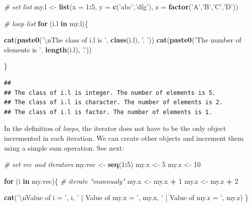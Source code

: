 \documentclass[11pt,]{book}
\newenvironment{Shaded}{\begin{snugshade}}{\end{snugshade}}
\newcommand{\KeywordTok}[1]{\textcolor[rgb]{0.27,0.27,0.27}{\textbf{#1}}}
\newcommand{\DataTypeTok}[1]{\textcolor[rgb]{0.27,0.27,0.27}{#1}}
\newcommand{\DecValTok}[1]{\textcolor[rgb]{0.06,0.06,0.06}{#1}}
\newcommand{\CharTok}[1]{\textcolor[rgb]{0.5,0.5,0.5}{#1}}
\newcommand{\StringTok}[1]{\textcolor[rgb]{0.5,0.5,0.5}{#1}}
\newcommand{\CommentTok}[1]{\textcolor[rgb]{0.56,0.35,0.01}{\textit{#1}}}
\newcommand{\ControlFlowTok}[1]{\textcolor[rgb]{0.13,0.29,0.53}{\textbf{#1}}}
\newcommand{\OperatorTok}[1]{\textcolor[rgb]{0.81,0.36,0.00}{\textbf{#1}}}
\newcommand{\NormalTok}[1]{#1}
\begin{document}
\begin{Shaded}
\begin{Highlighting}[]
\CommentTok{# set list}
\NormalTok{my.l <-}\StringTok{ }\KeywordTok{list}\NormalTok{(}\DataTypeTok{x =} \DecValTok{1}\OperatorTok{:}\DecValTok{5}\NormalTok{, }
             \DataTypeTok{y =} \KeywordTok{c}\NormalTok{(}\StringTok{'abc'}\NormalTok{,}\StringTok{'dfg'}\NormalTok{), }
             \DataTypeTok{z =} \KeywordTok{factor}\NormalTok{(}\StringTok{'A'}\NormalTok{,}\StringTok{'B'}\NormalTok{,}\StringTok{'C'}\NormalTok{,}\StringTok{'D'}\NormalTok{))}

\CommentTok{# loop list}
\ControlFlowTok{for}\NormalTok{ (i.l }\ControlFlowTok{in}\NormalTok{ my.l)\{}
  
  \KeywordTok{cat}\NormalTok{(}\KeywordTok{paste0}\NormalTok{(}\StringTok{'}\CharTok{\textbackslash{}n}\StringTok{The class of i.l is '}\NormalTok{, }\KeywordTok{class}\NormalTok{(i.l), }\StringTok{'. '}\NormalTok{))}
  \KeywordTok{cat}\NormalTok{(}\KeywordTok{paste0}\NormalTok{(}\StringTok{'The number of elements is '}\NormalTok{, }\KeywordTok{length}\NormalTok{(i.l), }\StringTok{'.'}\NormalTok{))}
  
\NormalTok{\}}
\end{Highlighting}
\end{Shaded}

\begin{verbatim}
## 
## The class of i.l is integer. The number of elements is 5.
## The class of i.l is character. The number of elements is 2.
## The class of i.l is factor. The number of elements is 1.
\end{verbatim}

In the definition of \emph{loops}, the iterator does not have to be the
only object incremented in each iteration. We can create other objects
and increment them using a simple sum operation. See next:

\begin{Shaded}
\begin{Highlighting}[]
\CommentTok{# set vec and iterators}
\NormalTok{my.vec <-}\StringTok{ }\KeywordTok{seq}\NormalTok{(}\DecValTok{1}\OperatorTok{:}\DecValTok{5}\NormalTok{)}
\NormalTok{my.x <-}\StringTok{ }\DecValTok{5}
\NormalTok{my.z <-}\StringTok{ }\DecValTok{10}

\ControlFlowTok{for}\NormalTok{ (i }\ControlFlowTok{in}\NormalTok{ my.vec)\{}
  \CommentTok{# iterate "mannualy"}
\NormalTok{  my.x <-}\StringTok{ }\NormalTok{my.x }\OperatorTok{+}\StringTok{ }\DecValTok{1}
\NormalTok{  my.z <-}\StringTok{ }\NormalTok{my.z }\OperatorTok{+}\StringTok{ }\DecValTok{2}
  
  \KeywordTok{cat}\NormalTok{(}\StringTok{'}\CharTok{\textbackslash{}n}\StringTok{Value of i = '}\NormalTok{, i, }
      \StringTok{' | Value of my.x = '}\NormalTok{, my.x, }
      \StringTok{' | Value of my.z = '}\NormalTok{, my.z)}
\NormalTok{\}}
\end{Highlighting}
\end{Shaded}
\end{document}
